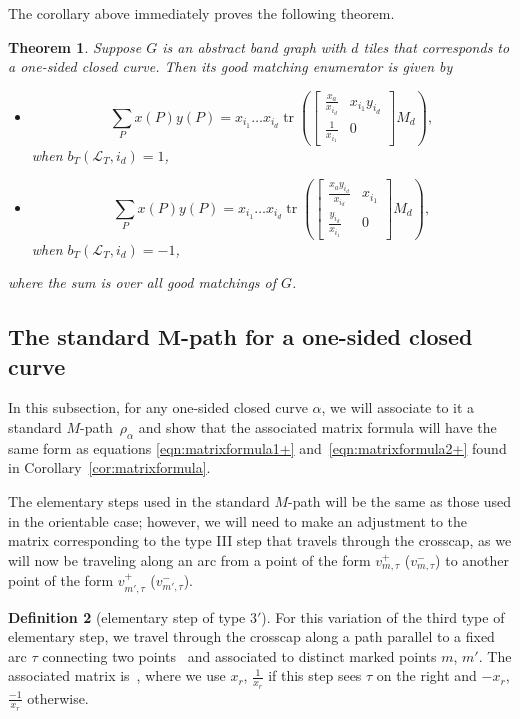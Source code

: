 \documentclass[pdftex]{sigma}
\numberwithin{equation}{section}
\newtheorem{Theorem}{Theorem}[section]
\theoremstyle{definition}
\newtheorem{Definition}[Theorem]{Definition}
\begin{document}
The corollary above immediately proves the following theorem.

\begin{Theorem}\label{theorem:quasigoodmatchingenum}
Suppose $G$ is an abstract band graph with $d$ tiles that corresponds to a one-sided closed curve. Then its good matching enumerator is given by
\begin{itemize}\itemsep=0pt
\item \[
\sum_Px(P)y(P)=x_{i_1}\ldots x_{i_d} \operatorname{tr}\left(\begin{bmatrix}
\frac{x_a}{x_{i_d}} & x_{i_1}y_{i_d}\\
\frac{1}{x_{i_1}} & 0
\end{bmatrix}M_d\right),\]
when $ b_{T}(\mathcal{L}_{T}, i_{d})=1$,
\item \[\sum_Px(P)y(P)=x_{i_1}\ldots x_{i_d} \operatorname{tr}\left(\begin{bmatrix}
\frac{x_ay_{i_d}}{x_{i_d}} & x_{i_1}\\
\frac{y_{i_d}}{x_{i_1}} & 0
\end{bmatrix}M_d\right),\]
 when $ b_{T}(\mathcal{L}_{T}, i_{d})=-1$,
\end{itemize}
where the sum is over all good matchings of $G$.
\end{Theorem}

\subsection[The standard M-path for a one-sided closed curve]{The standard $\boldsymbol{M}$-path for a one-sided closed curve}

In this subsection, for any one-sided closed curve $\alpha$, we will associate to it a standard $M$\nobreakdash-path~$\rho_{\alpha}$ and show that the associated matrix formula will have the same form as equations \eqref{eqn:matrixformula1+} and~\eqref{eqn:matrixformula2+} found in Corollary~\ref{cor:matrixformula}.

The elementary steps used in the standard $M$-path will be
the same as those used in the orientable case; however,
we will need to make an adjustment to the matrix corresponding to the type III step that
travels through the crosscap, as we will now be
traveling along an arc from a point of the form
$v_{m,\tau}^{+}$ ($v_{m,\tau}^{-}$) to another point of
the form $v_{m', \tau}^{+}$ ($v_{m',\tau}^{-}$).

\begin{Definition}[elementary step of type 3$'$]\label{definition:newstep}
For this variation of the third type of elementary step, we travel through the crosscap along a path parallel to a fixed arc $\tau$ connecting two points~ and  associated to distinct marked points $m$, $m'$. The associated matrix is~, where we use $x_r$, $\frac{1}{x_r}$ if this step sees $\tau$ on the right and $-x_r$, $\frac{-1}{x_r}$ otherwise.
\end{Definition}
\end{document}
